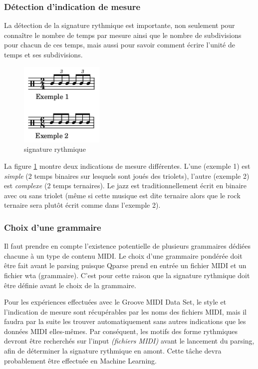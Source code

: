 \subsubsection{Détection d’indication de mesure}
La détection de la signature rythmique est importante, 
non seulement pour connaître le nombre de temps par mesure ainsi que le nombre
de subdivisions pour chacun de ces temps, mais aussi pour savoir comment écrire
l’unité de temps et ses subdivisions.

\begin{figure}[h]
	\centering
	\includegraphics[height=40mm, width=40mm]{z_images/3_methodes/2_systemes/0_simple_VS_complexe.png}
	\caption{signature rythmique}
	\label{subdivisions}
\end{figure} %

La figure \ref{subdivisions} montre deux indications de mesure différentes. 
L’une (exemple 1) est \textit{simple} (2 temps binaires sur lesquels sont joués des triolets), 
l’autre (exemple 2) est \textit{complexe} (2 temps ternaires). 
Le jazz est traditionnellement écrit en binaire avec ou sans triolet (même si cette musique est dite ternaire alors que le rock ternaire sera plutôt écrit comme dans l’exemple 2).

\subsubsection{Choix d’une grammaire}
Il faut prendre en compte l’existence potentielle de plusieurs grammaires dédiées chacune à un type de contenu MIDI. 
Le choix d’une grammaire pondérée doit être fait avant le parsing puisque Qparse prend en entrée un fichier MIDI et un fichier wta (grammaire). C’est pour cette raison que la signature rythmique doit être définie avant le choix de la grammaire.

Pour les expériences effectuées avec le Groove MIDI Data Set, 
le style et l’indication de mesure sont récupérables par les noms des fichiers MIDI, 
mais il faudra par la suite les trouver automatiquement sans autres indications 
que les données  MIDI elles-mêmes. 
Par conséquent, les motifs des forme rythmiques devront être recherchés sur l’input \textit{(fichiers MIDI)} 
avant le lancement du parsing, afin de déterminer la signature rythmique en amont. 
Cette tâche devra probablement être effectuée en Machine Learning. %


